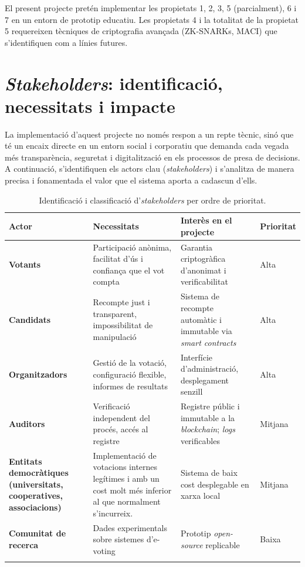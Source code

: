 \documentclass[12pt,a4paper,catalan]{article}
\begin{document}
El present projecte pretén implementar les propietats 1, 2, 3, 5 (parcialment), 6 i 7 en un entorn de prototip educatiu. Les propietats 4 i la totalitat de la propietat 5 requereixen tècniques de criptografia avançada (ZK-SNARKs, MACI) que s'identifiquen com a línies futures.
\section{\textit{Stakeholders}: identificació, necessitats i impacte}

La implementació d'aquest projecte no només respon a un repte tècnic, sinó que té un encaix directe en un entorn social i corporatiu que demanda cada vegada més transparència, seguretat i digitalització en els processos de presa de decisions. A continuació, s'identifiquen els actors clau (\textit{stakeholders}) i s'analitza de manera precisa i fonamentada el valor que el sistema aporta a cadascun d'ells.

\begin{longtable}{|>{\bfseries}p{3cm}|p{4.5cm}|p{4.5cm}|p{2.5cm}|}
    \hline
    \textbf{Actor} & \textbf{Necessitats} & \textbf{Interès en el projecte} & \textbf{Prioritat} \\
    \hline
    Votants & Participació anònima, facilitat d'ús i confiança que el vot compta & Garantia criptogràfica d'anonimat i verificabilitat & Alta \\
    \hline
    Candidats & Recompte just i transparent, impossibilitat de manipulació & Sistema de recompte automàtic i immutable via \textit{smart contracts} & Alta \\
    \hline
    Organitzadors & Gestió de la votació, configuració flexible, informes de resultats & Interfície d'administració, desplegament senzill & Alta \\
    \hline
    Auditors & Verificació independent del procés, accés al registre & Registre públic i immutable a la \textit{blockchain}; \textit{logs} verificables & Mitjana \\
    \hline
    Entitats democràtiques (universitats, cooperatives, associacions) & Implementació de votacions internes legítimes i amb un cost molt més inferior al que normalment s'incurreix. & Sistema de baix cost desplegable en xarxa local & Mitjana \\
    \hline
    Comunitat de recerca & Dades experimentals sobre sistemes d'e-voting & Prototip \textit{open-source} replicable & Baixa \\
    \hline
    \caption{Identificació i classificació d'\textit{stakeholders} per ordre de prioritat.}
\end{longtable}
\end{document}
